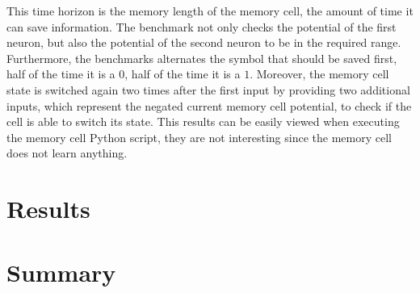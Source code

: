 \documentclass[draft,final]{vutinfth} %
\begin{document}
    This time horizon is the memory length of the memory cell, the amount of time it can save information.
    The benchmark not only checks the potential of the first neuron, but also the potential of the second neuron to be in the required range.
    Furthermore, the benchmarks alternates the symbol that should be saved first, half of the time it is a $0$, half of the time it is a $1$.
    Moreover, the memory cell state is switched again two times after the first input by providing two additional inputs, which represent the negated current memory cell potential, to check if the cell is able to switch its state.
    This results can be easily viewed when executing the memory cell Python script, they are not interesting since the memory cell does not learn anything.


    \chapter{Results}


    \chapter{Summary}


    \backmatter

    \listoffigures %

    \cleardoublepage %
    \listoftables %


    \printindex

    \printglossaries

    
    
\end{document}

